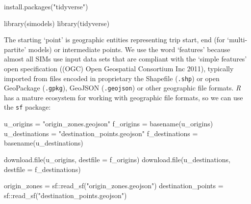 \documentclass[11pt,letterpaper]{article}
\newenvironment{Shaded}{\begin{snugshade}}{\end{snugshade}}
\newcommand{\AttributeTok}[1]{\textcolor[rgb]{0.77,0.63,0.00}{#1}}
\newcommand{\FunctionTok}[1]{\textcolor[rgb]{0.00,0.00,0.00}{#1}}
\newcommand{\NormalTok}[1]{#1}
\newcommand{\OtherTok}[1]{\textcolor[rgb]{0.56,0.35,0.01}{#1}}
\newcommand{\SpecialCharTok}[1]{\textcolor[rgb]{0.00,0.00,0.00}{#1}}
\newcommand{\StringTok}[1]{\textcolor[rgb]{0.31,0.60,0.02}{#1}}
\begin{document}
\begin{Shaded}
\begin{Highlighting}[]
\FunctionTok{install.packages}\NormalTok{(}\StringTok{"tidyverse"}\NormalTok{)}
\end{Highlighting}
\end{Shaded}

\begin{Shaded}
\begin{Highlighting}[]
\FunctionTok{library}\NormalTok{(simodels)}
\FunctionTok{library}\NormalTok{(tidyverse)}
\end{Highlighting}
\end{Shaded}

The starting `point' is geographic entities representing trip start, end (for `multi-partite' models) or intermediate points.
We use the word `features' because almost all SIMs use input data sets that are compliant with the `simple features' open specification ((OGC) Open Geospatial Consortium Inc 2011), typically imported from files encoded in proprietary the Shapefile (\texttt{.shp}) or open GeoPackage (\texttt{.gpkg}), GeoJSON (\texttt{.geojson}) or other geographic file formats.
\emph{R} has a mature ecosystem for working with geographic file formats, so we can use the \texttt{sf} package:

\begin{Shaded}
\begin{Highlighting}[]
\NormalTok{u\_origins }\OtherTok{=} \StringTok{"origin\_zones.geojson"}
\NormalTok{f\_origins }\OtherTok{=} \FunctionTok{basename}\NormalTok{(u\_origins)}
\NormalTok{u\_destinations }\OtherTok{=} \StringTok{"destination\_points.geojson"}
\NormalTok{f\_destinations }\OtherTok{=} \FunctionTok{basename}\NormalTok{(u\_destinations)}
\end{Highlighting}
\end{Shaded}

\begin{Shaded}
\begin{Highlighting}[]
\FunctionTok{download.file}\NormalTok{(u\_origins, }\AttributeTok{destfile =}\NormalTok{ f\_origins)}
\FunctionTok{download.file}\NormalTok{(u\_destinations, }\AttributeTok{destfile =}\NormalTok{ f\_destinations)}
\end{Highlighting}
\end{Shaded}

\begin{Shaded}
\begin{Highlighting}[]
\NormalTok{origin\_zones }\OtherTok{=}\NormalTok{ sf}\SpecialCharTok{::}\FunctionTok{read\_sf}\NormalTok{(}\StringTok{"origin\_zones.geojson"}\NormalTok{)}
\NormalTok{destination\_points }\OtherTok{=}\NormalTok{ sf}\SpecialCharTok{::}\FunctionTok{read\_sf}\NormalTok{(}\StringTok{"destination\_points.geojson"}\NormalTok{)}
\end{Highlighting}
\end{Shaded}
\end{document}
